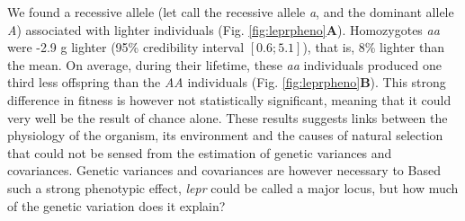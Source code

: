 We found a recessive allele (let call the recessive allele \emph{a}, and the dominant allele \emph{A}) associated with lighter individuals (Fig. \ref{fig:leprpheno}\textbf{A}). Homozygotes \emph{aa} were -2.9 g lighter (95\% credibility interval $[0.6;5.1]$), that is, 8\% lighter than the mean. On average, during their lifetime, these \emph{aa} individuals produced one third less offspring than the \emph{AA} individuals (Fig. \ref{fig:leprpheno}\textbf{B}). This strong difference in fitness is however not statistically significant, meaning that it could very well be the result of chance alone. These results suggests links between the physiology of the organism, its environment and the causes of natural selection that could not be sensed from the estimation of genetic variances and covariances. 
Genetic variances and covariances are however necessary to 
Based such a strong phenotypic effect, \emph{lepr} could be called a major locus, but how much of the genetic variation does it explain?

